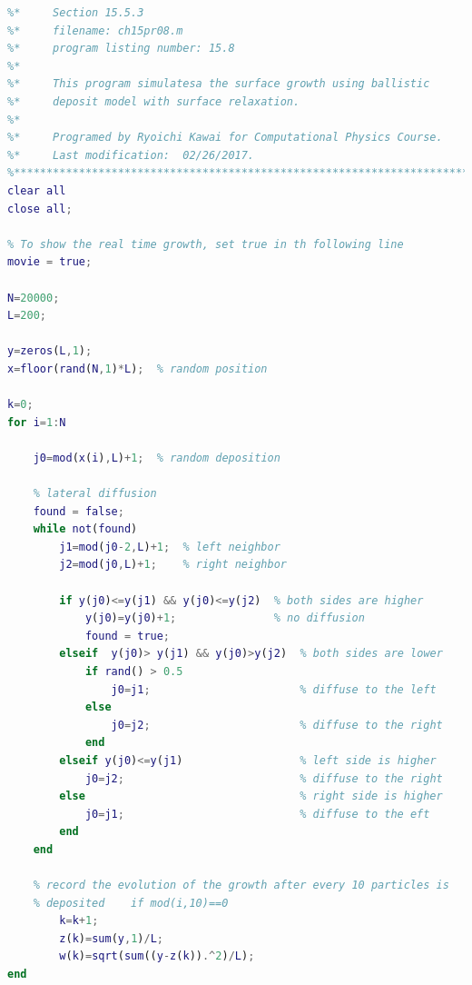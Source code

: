 \bigskip
\noindent
\program
\label{prog:bd2}
\footnotesize
\begin{lstlisting}[language=matlab]
%**************************************************************************
%*     Section 15.5.3                                                     *
%*     filename: ch15pr08.m                                               *
%*     program listing number: 15.8                                       *
%*                                                                        *
%*     This program simulatesa the surface growth using ballistic         *
%*     deposit model with surface relaxation.                             *
%*                                                                        *
%*     Programed by Ryoichi Kawai for Computational Physics Course.       *
%*     Last modification:  02/26/2017.                                    *
%**************************************************************************
clear all
close all;

% To show the real time growth, set true in th following line
movie = true;

N=20000;
L=200;

y=zeros(L,1);
x=floor(rand(N,1)*L);  % random position

k=0;
for i=1:N

    j0=mod(x(i),L)+1;  % random deposition
    
    % lateral diffusion
    found = false;
    while not(found)
        j1=mod(j0-2,L)+1;  % left neighbor
        j2=mod(j0,L)+1;    % right neighbor
        
        if y(j0)<=y(j1) && y(j0)<=y(j2)  % both sides are higher
            y(j0)=y(j0)+1;               % no diffusion
            found = true;
        elseif  y(j0)> y(j1) && y(j0)>y(j2)  % both sides are lower
            if rand() > 0.5
                j0=j1;                       % diffuse to the left
            else
                j0=j2;                       % diffuse to the right
            end
        elseif y(j0)<=y(j1)                  % left side is higher
            j0=j2;                           % diffuse to the right
        else                                 % right side is higher
            j0=j1;                           % diffuse to the eft
        end
    end
    
    % record the evolution of the growth after every 10 particles is
    % deposited    if mod(i,10)==0
        k=k+1;
        z(k)=sum(y,1)/L;
        w(k)=sqrt(sum((y-z(k)).^2)/L);
end



\end{lstlisting}
